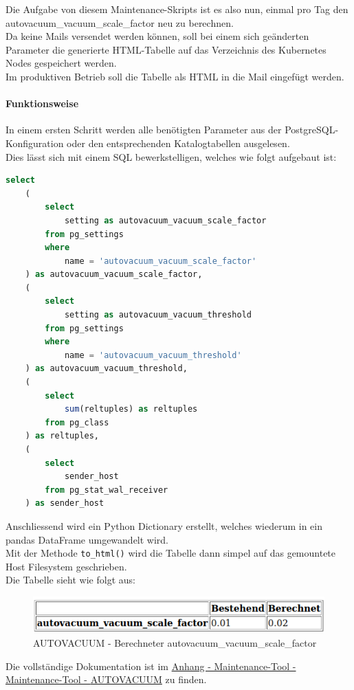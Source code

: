 \begin{flushleft}
    Die Aufgabe von diesem Maintenance-Skripts ist es also nun, einmal pro Tag den autovacuum\_vacuum\_scale\_factor neu zu berechnen.\\
    Da keine Mails versendet werden können, soll bei einem sich geänderten Parameter die generierte HTML-Tabelle auf das Verzeichnis des \Gls{Kubernetes} Nodes gespeichert werden.\\
    Im produktiven Betrieb soll die Tabelle als HTML in die Mail eingefügt werden.
    \paragraph{Funktionsweise}
    In einem ersten Schritt werden alle benötigten Parameter aus der \Gls{PostgreSQL}-Konfiguration oder den entsprechenden Katalogtabellen ausgelesen.\\
    Dies lässt sich mit einem SQL bewerkstelligen, welches wie folgt aufgebaut ist:
    \lstset{style=gra_codestyle}
    \begin{lstlisting}[language=sql, caption=Maintenance-Tool - Parameter - Maintenance-Tool - AUTOVACUUM,captionpos=b,label={lst:maintenannce-tool-parameter-maintenance-tool-autovacuum},breaklines=true]
select
    (
        select
            setting as autovacuum_vacuum_scale_factor
        from pg_settings
        where
            name = 'autovacuum_vacuum_scale_factor'
    ) as autovacuum_vacuum_scale_factor,
    (
        select
            setting as autovacuum_vacuum_threshold
        from pg_settings
        where
            name = 'autovacuum_vacuum_threshold'
    ) as autovacuum_vacuum_threshold,
    (
        select
            sum(reltuples) as reltuples
        from pg_class
    ) as reltuples,
    (
        select
            sender_host
        from pg_stat_wal_receiver
    ) as sender_host
    \end{lstlisting}
\end{flushleft}
\begin{flushleft}
    Anschliessend wird ein Python Dictionary erstellt, welches wiederum in ein pandas DataFrame umgewandelt wird.\\
    Mit der Methode \texttt{to\_html()} wird die Tabelle dann simpel auf das gemountete Host Filesystem geschrieben.\\
    Die Tabelle sieht wie folgt aus:
    \begin{figure}[H]
        \centering
        \includegraphics[width=1\linewidth]{source/implementation/construction_implementation/maintenance_tool_autovacuum/autovacuum_result_html_table}
        \caption{\Gls{AUTOVACUUM} - Berechneter autovacuum\_vacuum\_scale\_factor}
        \label{fig:autovacuum_result_html_table}
    \end{figure}
\end{flushleft}
\begin{flushleft}
    Die vollständige Dokumentation ist im \hyperref[subsec:maintenance_autovacuum]{Anhang - Maintenance-Tool - Maintenance-Tool - \Gls{AUTOVACUUM}} zu finden.
\end{flushleft}